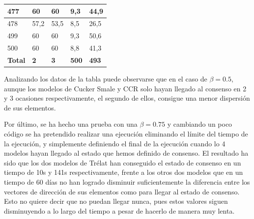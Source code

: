 \begin{table}[!h]
\begin{tabular}{|l|l|l|l|l|}
        477 & 60 & 60 & \cellcolor{green!15}9,3 & \cellcolor{green!15}44,9 \\ \hline
        478 & \cellcolor{green!15}57,2 & \cellcolor{green!15}53,5 & \cellcolor{green!15}8,5 & \cellcolor{green!15}26,5 \\ \hline \hline
        499 & 60 & 60 & \cellcolor{green!15}9,3 & \cellcolor{green!15}50,6 \\ \hline
        500 & 60 & 60 & \cellcolor{green!15}8,8 & \cellcolor{green!15}41,3 \\ \hline \hline
        \textbf{Total} & \textbf{2} & \textbf{3} & \textbf{500} & \textbf{493} \\ \hline
    \end{tabular}
    \label{tab:tiemposConsensoB05}
\end{table}

Analizando los datos de la tabla puede observarse que en el caso de $\beta=0.5$, aunque los modelos de Cucker Smale y CCR solo hayan llegado al consenso en 2 y 3 ocasiones respectivamente, el segundo de ellos, consigue una menor dispersión de sus elementos.

Por último, se ha hecho una prueba con una $\beta=0.75$ y cambiando un poco código se ha pretendido realizar una ejecución eliminando el límite del tiempo de la ejecución, y simplemente definiendo el final de la ejecución cuando lo 4 modelos hayan llegado al estado que hemos definido de consenso. El resultado ha sido que los dos modelos de Trélat han conseguido el estado de consenso en un tiempo de 10s y 141s respectivamente, frente a los otros dos modelos que en un tiempo de 60 días no han logrado disminuir suficientemente la diferencia entre los vectores de dirección de sus elementos como para llegar al estado de consenso. Esto no quiere decir que no puedan llegar nunca, pues estos valores siguen disminuyendo a lo largo del tiempo a pesar de hacerlo de manera muy lenta.